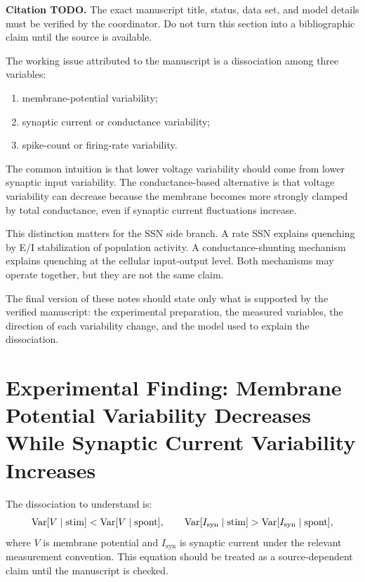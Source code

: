 \noindent\textbf{Citation TODO.} The exact manuscript title, status, data set, and model details must be verified by the coordinator. Do not turn this section into a bibliographic claim until the source is available.

The working issue attributed to the manuscript is a dissociation among three variables:
%
\begin{enumerate}[leftmargin=*]
  \item membrane-potential variability;
  \item synaptic current or conductance variability;
  \item spike-count or firing-rate variability.
\end{enumerate}
%
The common intuition is that lower voltage variability should come from lower synaptic input variability. The conductance-based alternative is that voltage variability can decrease because the membrane becomes more strongly clamped by total conductance, even if synaptic current fluctuations increase.

This distinction matters for the SSN side branch. A rate SSN explains quenching by E/I stabilization of population activity. A conductance-shunting mechanism explains quenching at the cellular input-output level. Both mechanisms may operate together, but they are not the same claim.

The final version of these notes should state only what is supported by the verified manuscript: the experimental preparation, the measured variables, the direction of each variability change, and the model used to explain the dissociation.

\section{Experimental Finding: Membrane Potential Variability Decreases While Synaptic Current Variability Increases}
\label{sec:membrane-potential-decreases-current-increases}

The dissociation to understand is:
%
\begin{equation}
  \operatorname{Var}[V\mid \mathrm{stim}]
  <
  \operatorname{Var}[V\mid \mathrm{spont}],
  \qquad
  \operatorname{Var}[I_{\mathrm{syn}}\mid \mathrm{stim}]
  >
  \operatorname{Var}[I_{\mathrm{syn}}\mid \mathrm{spont}],
  \label{eq:voltage-current-dissociation}
\end{equation}
%
where $V$ is membrane potential and $I_{\mathrm{syn}}$ is synaptic current under the relevant measurement convention. This equation should be treated as a source-dependent claim until the manuscript is checked.

